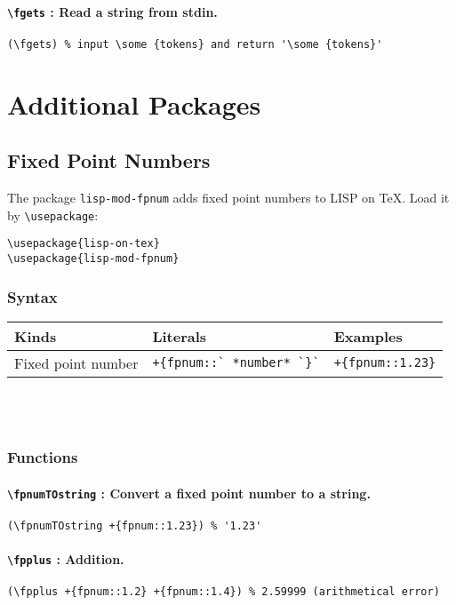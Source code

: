 \documentclass[10pt,a4paper]{article}
\newcommand{\pT}[1]{\textbf{\texttt{\textbackslash #1}}}
\begin{document}
\paragraph{\pT{fgets} : Read a string from stdin.}
\begin{verbatim}
(\fgets) % input \some {tokens} and return '\some {tokens}'
\end{verbatim}


\section{Additional Packages}

\subsection{Fixed Point Numbers}

The package \verb|lisp-mod-fpnum| adds fixed point numbers
to LISP on TeX. Load it by \verb|\usepackage|:
\begin{verbatim}
\usepackage{lisp-on-tex}
\usepackage{lisp-mod-fpnum}
\end{verbatim}


\subsubsection{Syntax}
\begin{tabular}{|l|l|l}
Kinds              & Literals     & Examples      \\
\hline
Fixed point number & \verb|+{fpnum::` *number* `}`|    & \verb|+{fpnum::1.23}| \\
\hline 
\end{tabular} \\ \\


\subsubsection{Functions}

\paragraph{\pT{fpnumTOstring} : Convert a fixed point number to a string.}
\begin{verbatim}
(\fpnumTOstring +{fpnum::1.23}) % '1.23'
\end{verbatim}

\paragraph{\pT{fpplus} : Addition.}
\begin{verbatim}
(\fpplus +{fpnum::1.2} +{fpnum::1.4}) % 2.59999 (arithmetical error)
\end{verbatim}
\end{document}
